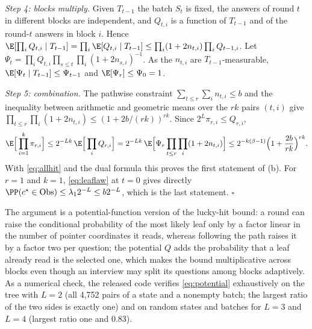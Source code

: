\emph{Step 4: blocks multiply.}
Given $T_{t-1}$ the batch $S_t$ is fixed, the answers of round $t$ in
different blocks are independent, and $Q_{t,i}$ is a function of $T_{t-1}$
and of the round-$t$ answers in block $i$. Hence
$\E[\prod_iQ_{t,i}\mid T_{t-1}]=\prod_i\E[Q_{t,i}\mid T_{t-1}]\le\prod_i(1+2n_{t,i})\prod_iQ_{t-1,i}$.
Let $\Psi_t=\prod_iQ_{t,i}\prod_{s\le t}\prod_i(1+2n_{s,i})^{-1}$. As the
$n_{t,i}$ are $T_{t-1}$-measurable, $\E[\Psi_t\mid T_{t-1}]\le\Psi_{t-1}$ and
$\E[\Psi_r]\le\Psi_0=1$.

\emph{Step 5: combination.}
The pathwise constraint $\sum_{t\le r}\sum_in_{t,i}\le b$ and the inequality
between arithmetic and geometric means over the $rk$ pairs $(t,i)$ give
$\prod_{t\le r}\prod_i(1+2n_{t,i})\le(1+2b/(rk))^{rk}$. Since
$2^L\pi_{r,i}\le Q_{r,i}$,
\[
 \E\Big[\prod_{i=1}^k\pi_{r,i}\Big]\le2^{-Lk}\,\E\Big[\prod_iQ_{r,i}\Big]
 =2^{-Lk}\,\E\Big[\Psi_r\prod_{t\le r}\prod_i(1+2n_{t,i})\Big]
 \le2^{-k(\beta-1)}\Big(1+\frac{2b}{rk}\Big)^{rk}.
\]
With \eqref{eq:allhit} and the dual formula this proves the first statement
of (b). For $r=1$ and $k=1$, \eqref{eq:leaflaw} at $t=0$ gives directly
$\PP(c^\star\in{\rm Obs})\le\lambda_12^{-L}\le b2^{-L}$, which is the last
statement. \hfill$\square$

The argument is a potential-function version of the lucky-hit bound: a
round can raise the conditional probability of the most likely leaf only by
a factor linear in the number of pointer coordinates it reads, whereas
following the path raises it by a factor two per question; the potential
$Q$ adds the probability that a leaf already read is the selected one, which
makes the bound multiplicative across blocks even though an interview may
split its questions among blocks adaptively. As a numerical check, the
released code verifies \eqref{eq:potential} exhaustively on the tree with
$L=2$ (all 4,752 pairs of a state and a nonempty batch; the largest ratio of
the two sides is exactly one) and on random states and batches for $L=3$
and $L=4$ (largest ratio one and $0.83$).
